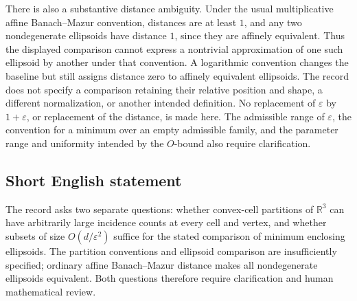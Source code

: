 \documentclass[11pt]{article}
\newcommand{\R}{\mathbb{R}}
\begin{document}
There is also a substantive distance ambiguity. Under the usual multiplicative affine Banach--Mazur convention, distances are at least \(1\), and any two nondegenerate ellipsoids have distance \(1\), since they are affinely equivalent. Thus the displayed comparison cannot express a nontrivial approximation of one such ellipsoid by another under that convention. A logarithmic convention changes the baseline but still assigns distance zero to affinely equivalent ellipsoids. The record does not specify a comparison retaining their relative position and shape, a different normalization, or another intended definition. No replacement of \(\varepsilon\) by \(1+\varepsilon\), or replacement of the distance, is made here. The admissible range of \(\varepsilon\), the convention for a minimum over an empty admissible family, and the parameter range and uniformity intended by the \(O\)-bound also require clarification.
\subsection{Short English statement}
The record asks two separate questions: whether convex-cell partitions of \(\R^3\) can have arbitrarily large incidence counts at every cell and vertex, and whether subsets of size \(O(d/\varepsilon^2)\) suffice for the stated comparison of minimum enclosing ellipsoids. The partition conventions and ellipsoid comparison are insufficiently specified; ordinary affine Banach--Mazur distance makes all nondegenerate ellipsoids equivalent. Both questions therefore require clarification and human mathematical review.
\end{document}
